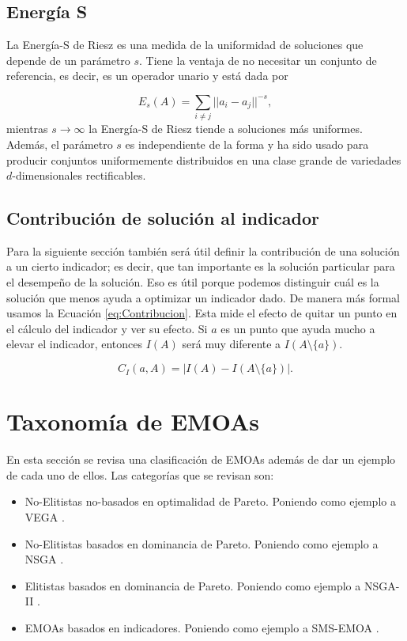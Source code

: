 \subsection{Energía S} \label{sec:Energía-S}
La Energía-S de Riesz \cite{sEnergy} es una medida de la uniformidad de soluciones que depende de un parámetro $s$. Tiene la ventaja de no necesitar un conjunto de referencia, es decir, es un operador unario y está dada por 

\begin{equation} \label{eq:S_energy}
    E_s(A)=\sum_{i\neq j} ||a_i-a_j||^{-s},
\end{equation}
mientras $s\rightarrow \infty$ la Energía-S de Riesz tiende a soluciones más uniformes. Además, el parámetro $s$ es independiente de la forma y ha sido usado para producir conjuntos uniformemente distribuidos en una clase grande de variedades $d$-dimensionales rectificables.

\subsection*{Contribución de solución al indicador}
Para la siguiente sección también será útil definir la contribución de una solución a un cierto indicador; es decir, que tan importante es la solución particular para el desempeño de la solución. Eso es útil porque podemos distinguir cuál es la solución que menos ayuda a optimizar un indicador dado. De manera más formal usamos la Ecuación \eqref{eq:Contribucion}. Esta mide el efecto de quitar un punto en el cálculo del indicador y ver su efecto. Si $a$ es un punto que ayuda mucho a elevar el indicador, entonces $I(A)$ será muy diferente a $I(A \setminus \{a\})$.

\begin{equation} \label{eq:Contribucion}
    C_I(a,A)=|I(A)-I(A \setminus \{a\}) |.
\end{equation}


\section{Taxonomía de EMOAs} \label{sec:QIs_tax}

En esta sección se revisa una clasificación de EMOAs además de dar un ejemplo de cada uno de ellos. Las categorías que se revisan son: 

\begin{itemize}
\item No-Elitistas no-basados en optimalidad de Pareto. Poniendo como ejemplo a VEGA \cite{schafferMultipleObjectiveOptimization1984}.
\item No-Elitistas basados en dominancia de Pareto. Poniendo como ejemplo a NSGA \cite{debFastElitistNondominated2000}.
\item Elitistas basados en dominancia de Pareto. Poniendo como ejemplo a NSGA-II \cite{seifbarghyNovelMetaheuristicAlgorithm2016}.
\item EMOAs basados en indicadores. Poniendo como ejemplo a SMS-EMOA \cite{SMS-EMOA}.
\end{itemize}



